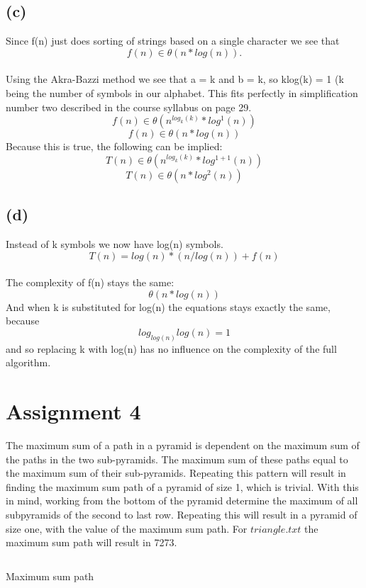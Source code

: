 \documentclass[a4paper,12px]{article}
\begin{document}
\subsection{(c)}
Since f(n) just does sorting of strings based on a single character we see that
$$f(n) \in \theta(n*log(n)).$$ \\
Using the Akra-Bazzi method we see that a = k and b = k, so klog(k) = 1 (k being the number of symbols in
our alphabet. This fits perfectly in simplification number two described in the
course syllabus on page 29.\\

$$f(n) \in \theta(n^{log_k(k)} * log^{1}(n))$$
$$f(n) \in \theta(n*log(n))$$
Because this is true, the following can be implied:
$$T(n) \in \theta( n^{log_k(k)} * log^{1+1}(n))$$ $$T(n) \in \theta(n * log^{2}(n))$$

\subsection{(d)}
Instead of k symbols we now have log(n) symbols.
$$T(n) = log(n) * (n/log(n)) + f(n)$$ \\
The complexity of f(n) stays the same: $$\theta(n*log(n))$$
And when k is substituted for log(n) the equations stays exactly the same,
because $$log_{log(n)}{log(n)} = 1$$
and so replacing k with log(n) has no influence on the complexity of the full algorithm.

\section{Assignment 4}
The maximum sum of a path in a pyramid is dependent on the maximum sum of the paths in the two sub-pyramids.
The maximum sum of these paths equal to the maximum sum of their sub-pyramids.
Repeating this pattern will result in finding the maximum sum path of a pyramid
of size 1, which is trivial. With this in mind, working from the bottom of the
pyramid determine the maximum of all subpyramids of the second to last row.
Repeating this will result in a pyramid of size one, with the value of the
maximum sum path. For $triangle.txt$ the maximum sum path will result in 7273.
\begin{listing}
\inputminted{python}{4.py}
\caption{Maximum sum path}
\end{listing}
\end{document}
